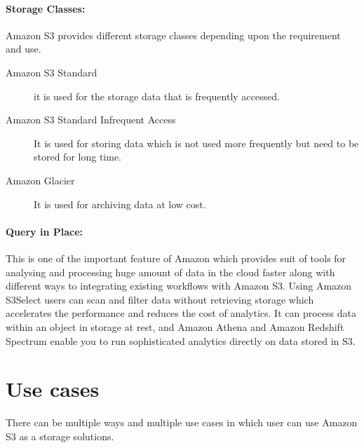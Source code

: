\paragraph{Storage Classes: }

Amazon S3 provides different storage classes depending upon the requirement and
use.
\begin{description}
\item [Amazon S3 Standard] it is used for the storage data that is frequently accessed.
\item [Amazon S3 Standard Infrequent Access] It is used for storing data which is not
used more frequently but need to be stored for long time.
\item [Amazon Glacier] It is used for archiving data at low cost. 

\end{description}


\paragraph{Query in Place: } 

This is one of the important feature of Amazon which provides suit of tools for
analysing and processing huge amount of data in the cloud faster along with
different ways to integrating existing workflows with Amazon S3. Using Amazon
S3Select users can scan and filter data without retrieving storage which
accelerates the performance and reduces the cost of analytics. It can process
data within an object in storage at rest, and Amazon Athena and Amazon Redshift
Spectrum enable you to run sophisticated analytics directly on data stored in
S3.

\section{Use cases}
There can be multiple ways and multiple use cases in which user can use Amazon
S3 as a storage solutions. 

